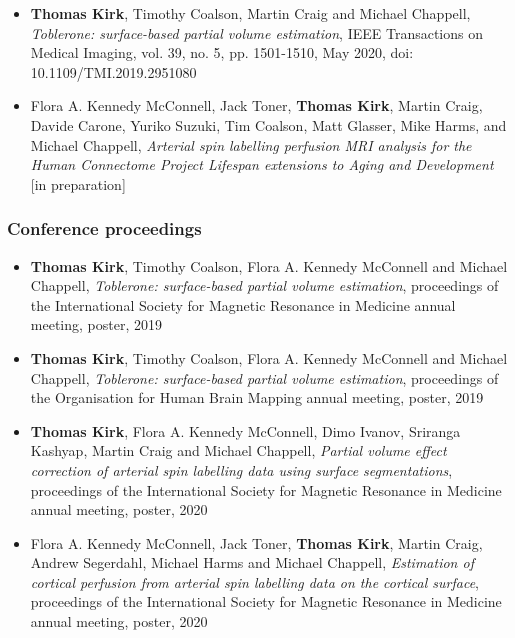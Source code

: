 \documentclass[12pt]{report}
\begin{document}
\begin{itemize}
\item{\textbf{Thomas Kirk}, Timothy Coalson, Martin Craig and Michael Chappell, \textit{Toblerone: surface-based partial volume estimation}, IEEE Transactions on Medical Imaging, vol. 39, no. 5, pp. 1501-1510, May 2020, doi: 10.1109/TMI.2019.2951080}

\item{Flora A. Kennedy McConnell, Jack Toner, \textbf{Thomas Kirk}, Martin Craig, Davide Carone, Yuriko Suzuki, Tim Coalson, Matt Glasser, Mike Harms, and Michael Chappell, \textit{Arterial spin labelling perfusion MRI analysis for the Human Connectome Project Lifespan extensions to Aging and Development} [in preparation]}
\end{itemize}


\subsubsection{Conference proceedings}

\begin{itemize}

\item{\textbf{Thomas Kirk}, Timothy Coalson, Flora A. Kennedy McConnell and Michael Chappell, \textit{Toblerone: surface-based partial volume estimation}, proceedings of the International Society for Magnetic Resonance in Medicine annual meeting, poster, 2019}

\item{\textbf{Thomas Kirk}, Timothy Coalson, Flora A. Kennedy McConnell and Michael Chappell, \textit{Toblerone: surface-based partial volume estimation}, proceedings of the Organisation for Human Brain Mapping annual meeting, poster, 2019}

\item{\textbf{Thomas Kirk}, Flora A. Kennedy McConnell, Dimo Ivanov, Sriranga Kashyap, Martin Craig and Michael Chappell, \textit{Partial volume effect correction of arterial spin labelling data using surface segmentations}, proceedings of the International Society for Magnetic Resonance in Medicine annual meeting, poster, 2020}

\item{Flora A. Kennedy McConnell, Jack Toner, \textbf{Thomas Kirk}, Martin Craig, Andrew Segerdahl, Michael Harms and Michael Chappell, \textit{Estimation of cortical perfusion from arterial spin labelling data on the cortical surface}, proceedings of the International Society for Magnetic Resonance in Medicine annual meeting, poster, 2020}

\end{itemize}
\end{document}

